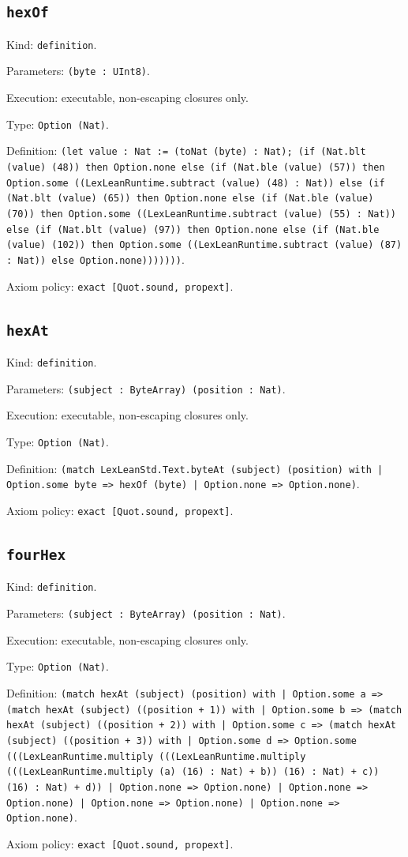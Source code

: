 \documentclass[11pt]{article}
\begin{document}
\subsection*{\texttt{hexOf}}
\noindent Kind: \texttt{definition}.\par
\noindent Parameters: \texttt{(byte : UInt8)}.\par
\noindent Execution: executable, non-escaping closures only.\par
\noindent Type: \texttt{Option (Nat)}.\par
\noindent Definition: \texttt{(let value : Nat := (toNat (byte) : Nat); (if (Nat.blt (value) (48)) then Option.none else (if (Nat.ble (value) (57)) then Option.some ((LexLeanRuntime.subtract (value) (48) : Nat)) else (if (Nat.blt (value) (65)) then Option.none else (if (Nat.ble (value) (70)) then Option.some ((LexLeanRuntime.subtract (value) (55) : Nat)) else (if (Nat.blt (value) (97)) then Option.none else (if (Nat.ble (value) (102)) then Option.some ((LexLeanRuntime.subtract (value) (87) : Nat)) else Option.none)))))))}.\par
\noindent Axiom policy: \texttt{exact [Quot.sound, propext]}.\par
\subsection*{\texttt{hexAt}}
\noindent Kind: \texttt{definition}.\par
\noindent Parameters: \texttt{(subject : ByteArray) (position : Nat)}.\par
\noindent Execution: executable, non-escaping closures only.\par
\noindent Type: \texttt{Option (Nat)}.\par
\noindent Definition: \texttt{(match LexLeanStd.Text.byteAt (subject) (position) with | Option.some byte => hexOf (byte) | Option.none => Option.none)}.\par
\noindent Axiom policy: \texttt{exact [Quot.sound, propext]}.\par
\subsection*{\texttt{fourHex}}
\noindent Kind: \texttt{definition}.\par
\noindent Parameters: \texttt{(subject : ByteArray) (position : Nat)}.\par
\noindent Execution: executable, non-escaping closures only.\par
\noindent Type: \texttt{Option (Nat)}.\par
\noindent Definition: \texttt{(match hexAt (subject) (position) with | Option.some a => (match hexAt (subject) ((position + 1)) with | Option.some b => (match hexAt (subject) ((position + 2)) with | Option.some c => (match hexAt (subject) ((position + 3)) with | Option.some d => Option.some (((LexLeanRuntime.multiply (((LexLeanRuntime.multiply (((LexLeanRuntime.multiply (a) (16) : Nat) + b)) (16) : Nat) + c)) (16) : Nat) + d)) | Option.none => Option.none) | Option.none => Option.none) | Option.none => Option.none) | Option.none => Option.none)}.\par
\noindent Axiom policy: \texttt{exact [Quot.sound, propext]}.\par
\end{document}
